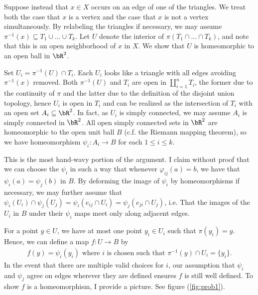 \begin{homework}[e]
\begin{prf}
		Suppose instead that $x \in X$ occurs on an edge of one of the triangles. We treat both the case that $x$ is a vertex and the case that $x$ is not a vertex simultaneously. By relabeling the triangles if necessary, we may assume $\pi^{-1}(x) \subseteq T_1\cup...\cup T_k$. Let $U$ denote the interior of $\pi(T_1\cap ...\cap T_k)$, and note that this is an open neighborhood of $x$ in $X$. We show that $U$ is homeomorphic to an open ball in $\bR^2$.

		Set $U_i = \pi^{-1}(U) \cap T_i$. Each $U_i$ looks like a triangle with all edges avoiding $\pi^{-1}(x)$ removed. Both $\pi^{-1}(U)$ and $T_i$ are open in $\coprod_{i=1}^n T_i$, the former due to the continuity of $\pi$ and the latter due to the definition of the disjoint union topology, hence $U_i$ is open in $T_i$ and can be realized as the intersection of $T_i$ with an open set $A_i \subseteq \bR^2$. In fact, as $U_i$ is simply connected, we may assume $A_i$ is simply connected in $\bR^2$. All open simply connected sets in $\bR^2$ are homeomorphic to the open unit ball $B$ (c.f. the Riemann mapping theorem), so we have homeomorphism $\psi_i:A_i \to B$ for each $1\leq i\leq k$.

		This is the most hand-wavy portion of the argument. I claim without proof that we can choose the $\psi_i$ in such a way that whenever $\varphi_{ij}(a) = b$, we have that $\psi_i(a) = \psi_j(b)$ in $B$. By deforming the image of $\psi_i$ by homeomorphisms if necessary, we may further assume that $\psi_i(U_i) \cap \psi_j(U_j) = \psi_i(e_{ij} \cap U_i) = \psi_j(e_{ji} \cap U_j)$, i.e. That the images of the $U_i$ in $B$ under their $\psi_i$ maps meet only along adjacent edges. 

		For a point $y \in U$, we have at most one point $y_i \in U_i$ such that $\pi(y_i) = y$. Hence, we can define a map $f:U \to B$ by
		\begin{align*}
			f(y) = \psi_i(y_i) \text{ where $i$ is chosen such that } \pi^{-1}(y)\cap U_i = \{y_i\}.
		\end{align*}
		In the event that there are multiple valid choices for $i$, our assumption that $\psi_i$ and $\psi_j$ agree on edges wherever they are defined ensures $f$ is still well defined. To show $f$ is a homeomorphism, I provide a picture. See figure (\ref{fig:prob1}).
	\end{prf}


\end{homework}
